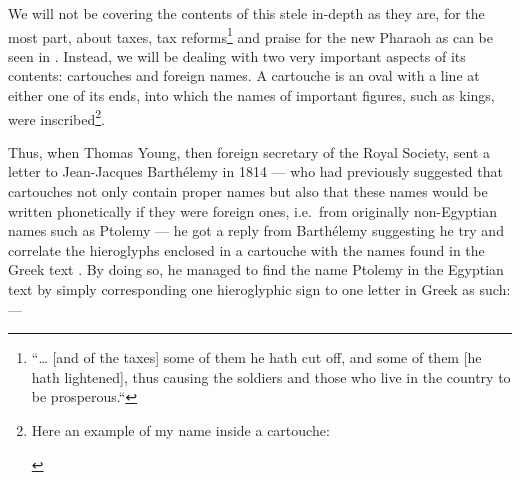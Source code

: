 \documentclass[a5paper,twoside,11pt]{report}
\begin{document}
	We will not be covering the contents of this stele in-depth as they are, for the most part, about taxes, tax reforms\footnote{“… [and of the taxes] some of them he hath cut off, and some of them [he hath lightened], thus causing the soldiers and those who live in the country to be prosperous.“\parencite[p. 202]{nilenotes}} and praise for the new Pharaoh as can be seen in \textcite{nilenotes}. Instead, we will be dealing with two very important aspects of its contents: cartouches and foreign names. A cartouche is an oval with a line at either one of its ends, into which the names of important figures, such as kings, were inscribed\footnote{Here an example of my name inside a cartouche: \SmallerText\SmallerText\begin{hieroglyph}{\leavevmode {}%
}\end{hieroglyph}}.

	Thus, when Thomas Young, then foreign secretary of the Royal Society, sent a letter to Jean-Jacques Barthélemy in 1814 — who had previously suggested that cartouches not only contain proper names but also that these names would be written phonetically if they were foreign ones, i.e.\ from originally non-Egyptian names such as Ptolemy — he got a reply from Barthélemy suggesting he try and correlate the hieroglyphs enclosed in a cartouche with the names found in the Greek text \parencite[p. 61]{lostlanguages}. By doing so, he managed to find the name Ptolemy in the Egyptian text by simply corresponding one hieroglyphic sign to one letter in Greek as such: —
\end{document}
